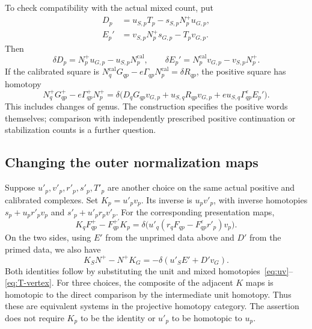 \documentclass[11pt]{amsart}
\theoremstyle{definition}
\theoremstyle{remark}
\theoremstyle{plain}
\newcommand{\eps}{\varepsilon}
\newcommand{\calib}{\mathrm{cal}}
\begin{document}
To check compatibility with the actual mixed count, put
\begin{align*}
 D_p&=u_{S,p}T_p-s_{S,p}N_p^+u_{G,p},\\
 E_p'&=v_{S,p}N_p^+s_{G,p}-T_pv_{G,p}.
\end{align*}
Then
\[
 \delta D_p=N_p^+u_{G,p}-u_{S,p}N_p^{\calib},\qquad
 \delta E_p'=N_p^{\calib}v_{G,p}-v_{S,p}N_p^+.
\]
If the calibrated square is
$N_q^{\calib}G_{qp}-e\Gamma_{qp}N_p^{\calib}=\delta R_{qp}$,
the positive square has homotopy
\begin{equation}\label{eq:positive-word-square}
 N_q^+G^+_{qp}-e\Gamma^+_{qp}N_p^+
 =\delta\bigl(D_qG_{qp}v_{G,p}+u_{S,q}R_{qp}v_{G,p}
                 +e u_{S,q}\Gamma_{qp}^\eps E_p'\bigr).
\end{equation}
This includes changes of genus. The construction specifies the
positive words themselves; comparison with independently prescribed
positive continuation or stabilization counts is a further question.

\subsection{Changing the outer normalization maps}
Suppose $u'_p,v'_p,r'_p,s'_p,T'_p$ are another choice on the same
actual positive and calibrated complexes. Set $K_p=u'_pv_p$.
Its inverse is $u_pv'_p$, with inverse homotopies
$s_p+u_pr'_pv_p$ and $s'_p+u'_pr_pv'_p$.
For the corresponding presentation maps,
\begin{equation}\label{eq:positive-choice-equivalence}
 K_qF^+_{qp}-F^{+\prime}_{qp}K_p
   =\delta\bigl(u'_q(r_qF_{qp}-F_{qp}^\eps r'_p)v_p\bigr).
\end{equation}
On the two sides, using $E'$ from the unprimed data above and
$D'$ from the primed data, we also have
\[
 K_SN^+-N^+K_G=-\delta(u'_SE'+D'v_G).
\]
Both identities follow by substituting the unit and mixed
homotopies~\eqref{eq:uv}--\eqref{eq:T-vertex}.
For three choices, the composite of the adjacent $K$ maps is
homotopic to the direct comparison by the intermediate unit
homotopy. Thus these are equivalent systems in the projective
homotopy category. The assertion does not require $K_p$ to be
the identity or $u'_p$ to be homotopic to $u_p$.
\end{document}

